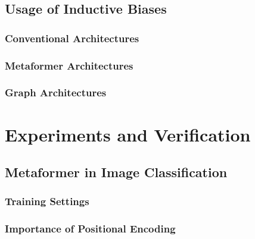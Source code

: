 \documentclass[
headings=optiontohead,              %
12pt,                               %
DIV=13,                             %
twoside=true,                       %
open=any,                         %
BCOR=10mm,                          %
toc=bibliographynumbered            %
]{scrreport}
\begin{document}
    \section{Usage of Inductive Biases}
    \label{sec:biases}
    
        \subsection{Conventional Architectures}
        \label{sec:architectures-biasesnormal}
        
        \FloatBarrier
        \subsection{Metaformer Architectures}
        \label{sec:architectures-biasesmetaformer}
        
        \FloatBarrier
        \subsection{Graph Architectures}
        \label{sec:architectures-biasesgraph}
        
        \FloatBarrier

\chapter{Experiments and Verification}
\label{sec:experiments}
    \section{Metaformer in Image Classification}
    \label{sec:experiments-image-classification}
    
        \subsection{Training Settings}
        \label{sec:experiments-trainingsettings}
        
        \FloatBarrier
        \subsection{Importance of Positional Encoding}
        \label{sec:experiments-positionalencoding}
        
        \FloatBarrier
\end{document}
